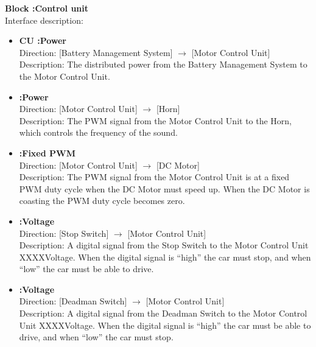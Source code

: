 \textbf{Block :Control unit}\\
Interface description:

\begin{itemize}
	\item \textbf{CU :Power}\\
		Direction: [Battery Management System] $\rightarrow$ [Motor Control Unit]\\
		Description: The distributed power from the Battery Management System to the Motor Control Unit.
	\item \textbf{:Power}\\
		Direction: [Motor Control Unit] $\rightarrow$ [Horn]\\
		Description: The PWM signal from the Motor Control Unit to the Horn, which controls the frequency of the sound.
	\item \textbf{:Fixed PWM}\\
		Direction: [Motor Control Unit] $\rightarrow$ [DC Motor]\\
		Description: The PWM signal from the Motor Control Unit is at a fixed PWM duty cycle when the DC Motor must speed up. When the DC Motor is coasting the PWM duty cycle becomes zero.
	\item \textbf{:Voltage}\\
		Direction: [Stop Switch] $\rightarrow$ [Motor Control Unit]\\
		Description: A digital signal from the Stop Switch to the Motor Control Unit XXXXVoltage. When the digital signal is “high” the car must stop, and when “low” the car must be able to drive.
	\item \textbf{:Voltage}\\
		Direction: [Deadman Switch] $\rightarrow$ [Motor Control Unit]\\
		Description: A digital signal from the Deadman Switch to the Motor Control Unit XXXXVoltage. When the digital signal is “high” the car must be able to drive, and when “low” the car must stop.
\end{itemize}
